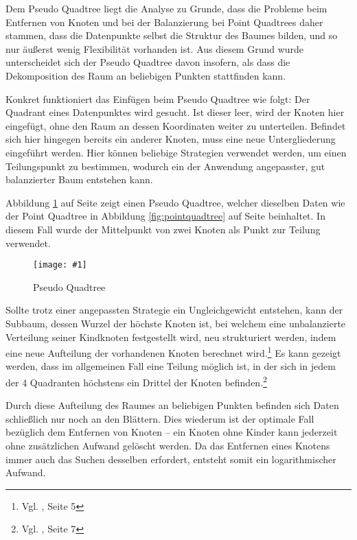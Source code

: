 \documentclass[%
			paper=a4,%
			DIV12,
			liststotoc,
			bibtotoc,
			draft=false,%
			titlepage
			]{scrartcl}
\newcommand{\zit}[3]{#1 \cite{#2}, #3}
\newcommand{\footzit}[3]{\footnote{\zit{#1}{#2}{#3}}}
\newcommand{\myfig}[5] {
 \begin{figure}[tbph]
	 \centering
	 \texttt{[image: \#1]}
	 \caption[#4]{#5}
	 \label{fig:#2}
 \end{figure}
}
\begin{document}
Dem Pseudo Quadtree liegt die Analyse zu Grunde, dass die Probleme beim Entfernen von Knoten und bei der Balanzierung bei Point Quadtrees daher stammen, dass die Datenpunkte selbst die Struktur des Baumes bilden, und so nur äußerst wenig Flexibilität vorhanden ist.
Aus diesem Grund wurde unterscheidet sich der Pseudo Quadtree davon insofern, als dass die Dekomposition des Raum an beliebigen Punkten stattfinden kann. 

Konkret funktioniert das Einfügen beim Pseudo Quadtree wie folgt:
Der Quadrant eines Datenpunktes wird gesucht.
Ist dieser leer, wird der Knoten hier eingefügt, ohne den Raum an dessen Koordinaten weiter zu unterteilen.
Befindet sich hier hingegen bereits ein anderer Knoten, muss eine neue Untergliederung eingeführt werden.
Hier können beliebige Strategien verwendet werden, um einen Teilungspunkt zu bestimmen, wodurch ein der Anwendung angepasster, gut balanzierter Baum entstehen kann.

Abbildung \ref{fig:pseudoquadtree} auf Seite \pageref{fig:pseudoquadtree} zeigt einen Pseudo Quadtree, welcher dieselben Daten wie der Point Quadtree in Abbildung \ref{fig:pointquadtree} auf Seite \pageref{fig:pointquadtree} beinhaltet.
In diesem Fall wurde der Mittelpunkt von zwei Knoten als Punkt zur Teilung verwendet.
\myfig{img/pseudoquadtree-ins3-trimmed}{pseudoquadtree}{width=.6\textwidth}{Pseudo Quadtree}{Pseudo Quadtree}

Sollte trotz einer angepassten Strategie ein Ungleichgewicht entstehen, kann der Subbaum, dessen Wurzel der höchste Knoten ist, bei welchem eine unbalanzierte Verteilung seiner Kindknoten festgestellt wird, neu strukturiert werden, indem eine neue Aufteilung der vorhandenen Knoten berechnet wird.\footzit{Vgl.}{DBLP:journals/acta/OvermarsL82}{Seite 5} %
Es kann gezeigt werden, dass im allgemeinen Fall eine Teilung möglich ist, in der sich in jedem der 4 Quadranten höchstens ein Drittel der Knoten befinden.\footzit{Vgl.}{DBLP:journals/acta/OvermarsL82}{Seite 7} %

Durch diese Aufteilung des Raumes an beliebigen Punkten befinden sich Daten schließlich nur noch an den Blättern. Dies wiederum ist der optimale Fall bezüglich dem Entfernen von Knoten -- ein Knoten ohne Kinder kann jederzeit ohne zusätzlichen Aufwand gelöscht werden. Da das Entfernen eines Knotens immer auch das Suchen desselben erfordert, entsteht somit ein logarithmischer Aufwand.

\end{document}
